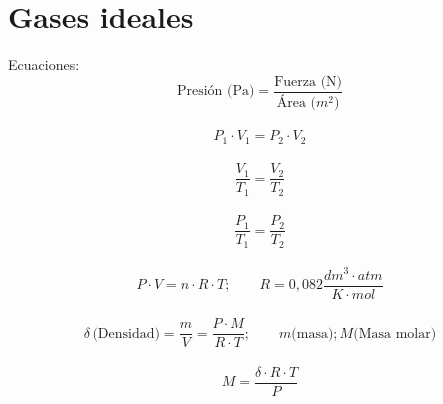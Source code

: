 \documentclass[../Teoría.root.tex]{subfiles}
\begin{document}
\section{Gases ideales}
Ecuaciones:
$$ \text{Presión (Pa)} = \frac{\text{Fuerza (N)}}{\text{Área ($m^2$)}} $$
\\
$$ P_1 \cdot V_1 = P_2 \cdot V_2 $$
\\
$$ \frac{V_1}{T_1}=\frac{V_2}{T_2} $$
\\
$$ \frac{P_1}{T_1}=\frac{P_2}{T_2} $$
\\
$$ P\cdot V=n\cdot R\cdot T;\qquad R = 0,082 \frac{dm^3\cdot atm}{K\cdot mol} $$
\\
$$ \delta\,\text{(Densidad)} = \frac{m}{V} = \frac{P\cdot M}{R\cdot T}; \qquad m \text{(masa)}; M \text{(Masa molar)} $$
\\
$$ M=\frac{\delta\cdot R\cdot T}{P} $$
\end{document}
